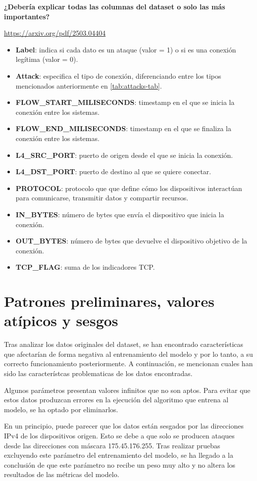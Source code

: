 \textbf{¿Debería explicar todas las columnas del dataset o solo las más importantes?}

\url{https://arxiv.org/pdf/2503.04404}

\begin{itemize}
\item \textbf{Label}: indica si cada dato es un ataque (valor = 1) o si es una conexión legítima (valor = 0).
\item \textbf{Attack}: especifica el tipo de conexión, diferenciando entre los tipos mencionados anteriormente en \ref{tab:attacks-tab}.
\item\textbf{FLOW\_START\_MILISECONDS}: timestamp en el que se inicia la conexión entre los sistemas.
\item\textbf{FLOW\_END\_MILISECONDS}: timestamp en el que se finaliza la conexión entre los sistemas.
\item\textbf{L4\_SRC\_PORT}: puerto de origen desde el que se inicia la conexión.
\item\textbf{L4\_DST\_PORT}: puerto de destino al que se quiere conectar.
\item\textbf{PROTOCOL}: protocolo que que define cómo los dispositivos interactúan para comunicarse, transmitir datos y compartir recursos.
\item\textbf{IN\_BYTES}: número de bytes que envía el dispositivo que inicia la conexión.
\item\textbf{OUT\_BYTES}: número de bytes que devuelve el dispositivo objetivo de la conexión.
\item\textbf{TCP\_FLAG}: suma de los indicadores TCP.
\end{itemize}


\section{Patrones preliminares, valores atípicos y sesgos} \label{sec.segos-datos}

Tras analizar los datos originales del dataset, se han encontrado características que afectarían de forma negativa al entrenamiento del modelo y por lo tanto, a su correcto funcionamiento posteriormente. A continuación, se mencionan cuales han sido las característcas problematicas de los datos encontradas.


Algunos parámetros presentan valores infinitos que no son aptos. Para evitar que estos datos produzcan errores en la ejecución del algoritmo que entrena al modelo, se ha optado por eliminarlos.

En un principio, puede parecer que los datos están sesgados por las direcciones IPv4 de los dispositivos origen. Esto se debe a que solo se producen ataques desde las direcciones con máscara 175.45.176.255. Tras realizar pruebas excluyendo este parámetro del entrenamiento del modelo, se ha llegado a la conclusión de que este parámetro no recibe un peso muy alto y no altera los resultados de las métricas del modelo.



